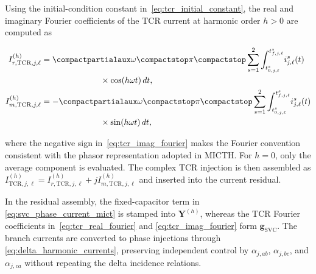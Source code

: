 \documentclass[journal]{IEEEtran}
\begin{document}
Using the initial-condition constant in~\eqref{eq:tcr_initial_constant}, the
real and imaginary Fourier coefficients of the TCR current at harmonic order
$h>0$ are computed as

\begin{align}
    I_{r,\mathrm{TCR},j,\ell}^{(h)}
    &=\frac{\omega}{\pi}
      \sum_{s=1}^{2}
      \int_{t_{0,j,\ell}^{s}}^{t_{f,j,\ell}^{s}}
      \!
      i_{j,\ell}^{s}(t) \notag \\
    &\hspace{25mm}\times \cos(h\omega t)\,dt,
      \label{eq:tcr_real_fourier} \\
    I_{m,\mathrm{TCR},j,\ell}^{(h)}
    &=-\frac{\omega}{\pi}
      \sum_{s=1}^{2}
      \int_{t_{0,j,\ell}^{s}}^{t_{f,j,\ell}^{s}}
      \!
      i_{j,\ell}^{s}(t) \notag \\
    &\hspace{25mm}\times \sin(h\omega t)\,dt,
      \label{eq:tcr_imag_fourier}
\end{align}

\noindent where the negative sign in~\eqref{eq:tcr_imag_fourier} makes the
Fourier convention consistent with the phasor representation adopted in
MICTH. For $h=0$, only the average component is evaluated. The complex TCR
injection is then assembled as
$I_{\mathrm{TCR},j,\ell}^{(h)}=I_{r,\mathrm{TCR},j,\ell}^{(h)}+
 jI_{m,\mathrm{TCR},j,\ell}^{(h)}$ and inserted into the current residual.

In the residual assembly, the fixed-capacitor term in
\eqref{eq:svc_phase_current_mict} is stamped into $\mathbf{Y}^{(h)}$, whereas
the TCR Fourier coefficients in~\eqref{eq:tcr_real_fourier} and
\eqref{eq:tcr_imag_fourier} form $\mathbf{g}_{\mathrm{SVC}}$. The branch
currents are converted to phase injections through
\eqref{eq:delta_harmonic_currents}, preserving independent control by
$\alpha_{j,ab}$, $\alpha_{j,bc}$, and $\alpha_{j,ca}$ without repeating the
delta incidence relations.
\end{document}
